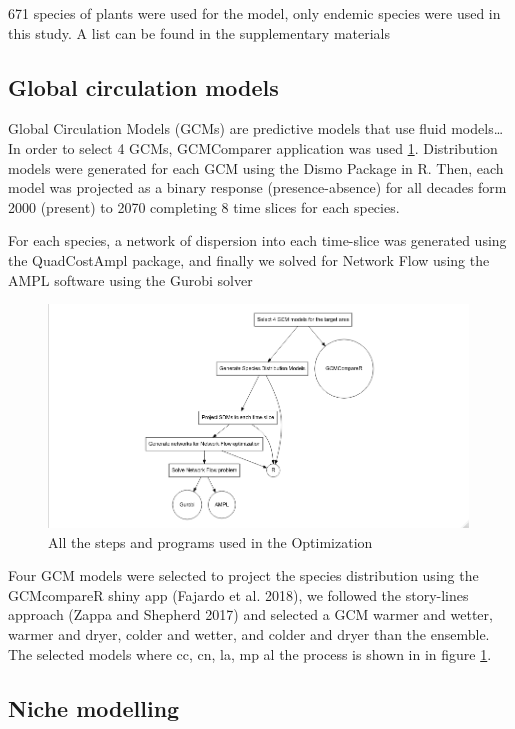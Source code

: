 \documentclass[]{article}
\begin{document}
671 species of plants were used for the model, only endemic species were used in this study. A list can be found in the supplementary materials

\hypertarget{global-circulation-models}{%
\subsection{Global circulation models}\label{global-circulation-models}}

Global Circulation Models (GCMs) are predictive models that use fluid models\ldots{} In order to select 4 GCMs, GCMComparer application was used \ref{fig:Diagrama}. Distribution models were generated for each GCM using the Dismo Package in R. Then, each model was projected as a binary response (presence-absence) for all decades form 2000 (present) to 2070 completing 8 time slices for each species.

For each species, a network of dispersion into each time-slice was generated using the QuadCostAmpl package, and finally we solved for Network Flow using the AMPL software using the Gurobi solver

\begin{figure}
\includegraphics[width=4.39in]{Diag1} \caption{All the steps and programs used in the Optimization}\label{fig:Diagrama}
\end{figure}

Four GCM models were selected to project the species distribution using the GCMcompareR shiny app (Fajardo et al. 2018), we followed the story-lines approach (Zappa and Shepherd 2017) and selected a GCM warmer and wetter, warmer and dryer, colder and wetter, and colder and dryer than the ensemble. The selected models where cc, cn, la, mp al the process is shown in in figure \ref{fig:Diagrama}.

\hypertarget{niche-modelling}{%
\subsection{Niche modelling}\label{niche-modelling}}
\end{document}
